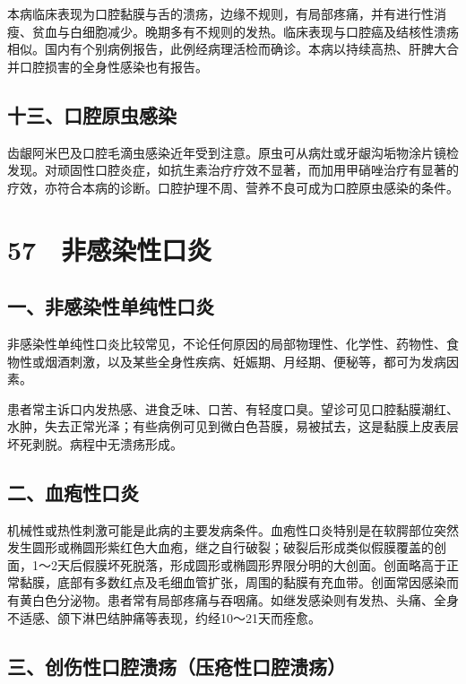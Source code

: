 本病临床表现为口腔黏膜与舌的溃疡，边缘不规则，有局部疼痛，并有进行性消瘦、贫血与白细胞减少。晚期多有不规则的发热。临床表现与口腔癌及结核性溃疡相似。国内有个别病例报告，此例经病理活检而确诊。本病以持续高热、肝脾大合并口腔损害的全身性感染也有报告。

\subsection{十三、口腔原虫感染}

齿龈阿米巴及口腔毛滴虫感染近年受到注意。原虫可从病灶或牙龈沟垢物涂片镜检发现。对顽固性口腔炎症，如抗生素治疗疗效不显著，而加用甲硝唑治疗有显著的疗效，亦符合本病的诊断。口腔护理不周、营养不良可成为口腔原虫感染的条件。

\protect\hypertarget{text00150.html}{}{}

\section{57　非感染性口炎}

\subsection{一、非感染性单纯性口炎}

非感染性单纯性口炎比较常见，不论任何原因的局部物理性、化学性、药物性、食物性或烟酒刺激，以及某些全身性疾病、妊娠期、月经期、便秘等，都可为发病因素。

患者常主诉口内发热感、进食乏味、口苦、有轻度口臭。望诊可见口腔黏膜潮红、水肿，失去正常光泽；有些病例可见到微白色苔膜，易被拭去，这是黏膜上皮表层坏死剥脱。病程中无溃疡形成。

\subsection{二、血疱性口炎}

机械性或热性刺激可能是此病的主要发病条件。血疱性口炎特别是在软腭部位突然发生圆形或椭圆形紫红色大血疱，继之自行破裂；破裂后形成类似假膜覆盖的创面，1～2天后假膜坏死脱落，形成圆形或椭圆形界限分明的大创面。创面略高于正常黏膜，底部有多数红点及毛细血管扩张，周围的黏膜有充血带。创面常因感染而有黄白色分泌物。患者常有局部疼痛与吞咽痛。如继发感染则有发热、头痛、全身不适感、颌下淋巴结肿痛等表现，约经10～21天而痊愈。

\subsection{三、创伤性口腔溃疡（压疮性口腔溃疡）}


